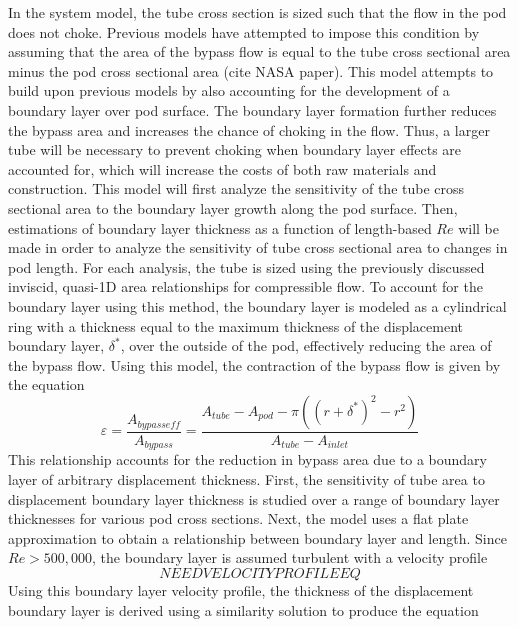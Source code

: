 In the system model, the tube cross section is sized such that the flow in the pod does not choke. Previous models have attempted to impose this condition by assuming that the area of the bypass flow is equal to the tube cross sectional area minus the pod cross sectional area (cite NASA paper). This model attempts to build upon previous models by also accounting for the development of a boundary layer over pod surface. The boundary layer formation further reduces the bypass area and increases the chance of choking in the flow. Thus, a larger tube will be necessary to prevent choking when boundary layer effects are accounted for, which will increase the costs of both raw materials and construction. This model will first analyze the sensitivity of the tube cross sectional area to the boundary layer growth along the pod surface. Then, estimations of boundary layer thickness as a function of length-based $Re$ will be made in order to analyze the sensitivity of tube cross sectional area to changes in pod length.
For each analysis, the tube is sized using the previously discussed inviscid, quasi-1D area relationships for compressible flow. To account for the boundary layer using this method, the boundary layer is modeled as a cylindrical ring with a thickness equal to the maximum thickness of the displacement boundary layer, $\delta^{*}$, over the outside of the pod, effectively reducing the area of the bypass flow. Using this model, the contraction of the bypass flow is given by the equation
\begin{equation}
	\label{eq:epsilon}
	\varepsilon  = \frac{A_{bypass eff}}{A_{bypass}} = \frac{A_{tube}-A_{pod} -\pi  (  ( r+\delta ^{*}  )^{2}-r^{2}  )}{A_{tube}-A_{inlet}}
\end{equation}
This relationship accounts for the reduction in bypass area due to a boundary layer of arbitrary displacement thickness. First, the sensitivity of tube area to displacement boundary layer thickness is studied over a range of boundary layer thicknesses for various pod cross sections. Next, the model uses a flat plate approximation to obtain a relationship between boundary layer and length. Since $Re > 500,000$, the boundary layer is assumed turbulent with a velocity profile \cite{FoxAndMcDonald}
\begin{equation}
	\label{eq:boundary_layer_profile}
	NEED VELOCITY PROFILE EQ
\end{equation}
Using this boundary layer velocity profile, the thickness of the displacement boundary layer is derived using a similarity solution to produce the equation \cite{FoxAndMcDonald}
